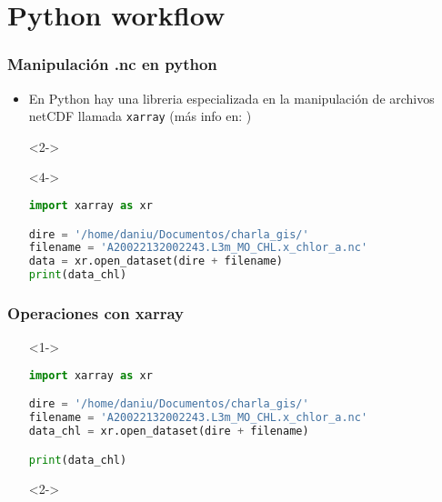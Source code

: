 \documentclass{beamer}
\begin{document}
\section{Python workflow}

\begin{frame}[t,fragile]
\frametitle{Manipulación .nc en python}

\begin{itemize}

	\item<1-> En Python hay una libreria especializada en la manipulación de archivos netCDF llamada \texttt{xarray} (más info en: \href{http://xarray.pydata.org/en/stable/}{})

	\item[]<2-> 
	\begin{figure}
	\end{figure}

	\item[]<4-> 

\begin{lstlisting}[language=python, basicstyle=\scriptsize]
import xarray as xr

dire = '/home/daniu/Documentos/charla_gis/'
filename = 'A20022132002243.L3m_MO_CHL.x_chlor_a.nc'
data = xr.open_dataset(dire + filename)
print(data_chl)
\end{lstlisting}

\end{itemize}
\end{frame}


\begin{frame}[fragile]
\frametitle{Operaciones con xarray}

\begin{itemize}
	\item[]<1->
\begin{lstlisting}[language=python, basicstyle=\scriptsize]
import xarray as xr

dire = '/home/daniu/Documentos/charla_gis/'
filename = 'A20022132002243.L3m_MO_CHL.x_chlor_a.nc'
data_chl = xr.open_dataset(dire + filename)

print(data_chl)
\end{lstlisting}

	\item[]<2->
\begin{figure}
	
	
\end{figure}

\end{itemize}
\end{frame}
\end{document}
